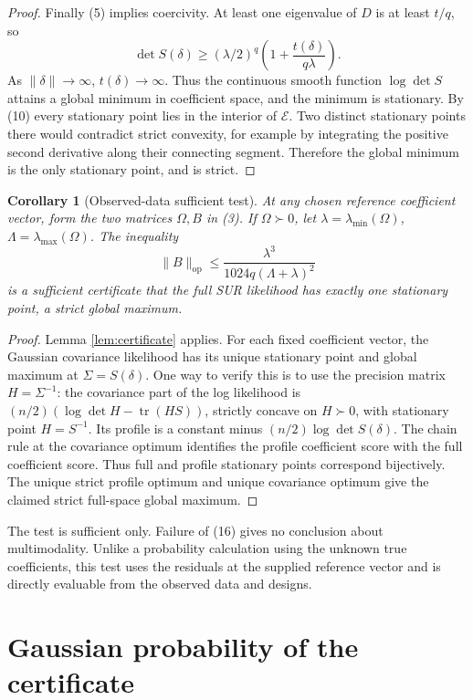 \documentclass[11pt]{article}
\newtheorem{corollary}[theorem]{Corollary}
\newcommand{\tr}{\operatorname{tr}}
\newcommand{\op}{\mathrm{op}}
\begin{document}
\begin{proof}
Finally (5) implies coercivity. At least one eigenvalue of \(D\)
is at least \(t/q\), so
\[
 \det S(\delta)
 \geq(\lambda/2)^q\left(1+\frac{t(\delta)}{q\lambda}\right).
 \tag{15}
\]
As \(\|\delta\|\to\infty\), \(t(\delta)\to\infty\).
Thus the continuous smooth function \(\log\det S\) attains a
global minimum in coefficient space, and the minimum is stationary.
By (10) every stationary point lies in the interior of
\(\mathcal E\). Two distinct stationary points there would
contradict strict convexity, for example by integrating the positive
second derivative along their connecting segment. Therefore the
global minimum is the only stationary point, and is strict.
\end{proof}

\begin{corollary}[Observed-data sufficient test]\label{cor:test}
At any chosen reference coefficient vector, form the two matrices
\(\Omega,B\) in (3). If \(\Omega\succ0\), let
\(\lambda=\lambda_{\min}(\Omega)\),
\(\Lambda=\lambda_{\max}(\Omega)\).
The inequality
\[
 \|B\|_{\op}\leq
 \frac{\lambda^3}{1024q(\Lambda+\lambda)^2}
 \tag{16}
\]
is a sufficient certificate that the full SUR likelihood has exactly
one stationary point, a strict global maximum.
\end{corollary}

\begin{proof}
Lemma \ref{lem:certificate} applies. For each fixed coefficient vector,
the Gaussian covariance likelihood has its unique stationary point
and global maximum at \(\Sigma=S(\delta)\). One way to verify this
is to use the precision matrix \(H=\Sigma^{-1}\): the covariance
part of the log likelihood is
\((n/2)(\log\det H-\tr(HS))\), strictly concave on \(H\succ0\),
with stationary point \(H=S^{-1}\).
Its profile is a constant minus \((n/2)\log\det S(\delta)\).
The chain rule at the covariance optimum identifies the profile
coefficient score with the full coefficient score. Thus full and
profile stationary points correspond bijectively. The unique strict
profile optimum and unique covariance optimum give the claimed
strict full-space global maximum.
\end{proof}

The test is sufficient only. Failure of (16) gives no conclusion about
multimodality. Unlike a probability calculation using the unknown true
coefficients, this test uses the residuals at the supplied reference
vector and is directly evaluable from the observed data and designs.

\section{Gaussian probability of the certificate}
\end{document}
